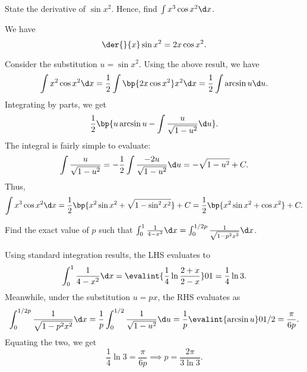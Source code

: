 \clearpage
\begin{problem}
    State the derivative of $\sin x^2$. Hence, find $\int x^3 \cos x^2 \d x$.
\end{problem}
\begin{solution}
    We have \[\der{}{x} \sin x^2 = 2x \cos x^2.\]

    Consider the substitution $u = \sin x^2$. Using the above result, we have \[\int x^2 \cos x^2 \d x =\frac12 \int \bp{2x \cos x^2} x^2 \d x = \frac12 \int \arcsin u \d u.\] Integrating by parts, we get \[\frac12 \bp{u \arcsin u - \int \frac{u}{\sqrt{1 - u^2}} \d u}.\] The integral is fairly simple to evaluate: \[\int \frac{u}{\sqrt{1 - u^2}} = -\frac12 \int \frac{-2u}{\sqrt{1 - u^2}} \d u = -\sqrt{1 - u^2} + C.\] Thus, \[\int x^3 \cos x^2 \d x = \frac12 \bp{x^2 \sin x^2 + \sqrt{1 - \sin^2 x^2}} + C = \frac12 \bp{x^2 \sin x^2 + \cos x^2} + C.\]
\end{solution}

\begin{problem}
    Find the exact value of $p$ such that $\int_0^1 \frac1{4 - x^2} \d x = \int_0^{1/2p} \frac1{\sqrt{1 - p^2 x^2}} \d x$.
\end{problem}
\begin{solution}
    Using standard integration results, the LHS evaluates to \[\int_0^1 \frac1{4 - x^2} \d x = \evalint{\frac1{4} \ln \frac{2 + x}{2 - x}}01 = \frac14 \ln 3.\] Meanwhile, under the substitution $u = px$, the RHS evaluates as \[\int_0^{1/2p} \frac1{\sqrt{1 - p^2 x^2}} \d x = \frac1p \int_0^{1/2} \frac1{\sqrt{1 - u^2}} \d u = \frac1p \evalint{\arcsin u}0{1/2} = \frac{\pi}{6p}.\] Equating the two, we get \[\frac14 \ln 3 = \frac{\pi}{6p} \implies p = \frac{2\pi}{3\ln3}.\]
\end{solution}

